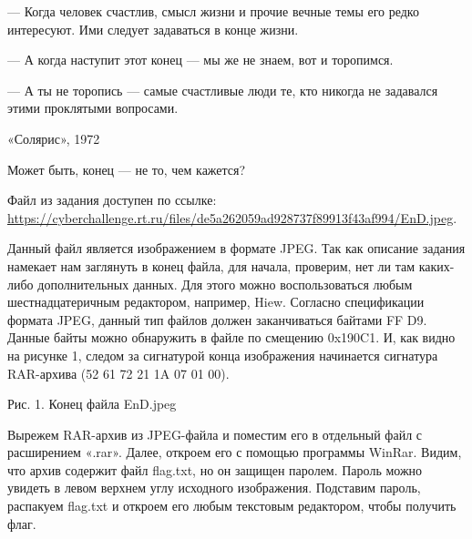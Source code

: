 
— Когда человек счастлив, смысл жизни и прочие вечные темы его редко интересуют. Ими следует задаваться в конце жизни.

— А когда наступит этот конец — мы же не знаем, вот и торопимся.

— А ты не торопись — самые счастливые люди те, кто никогда не задавался этими проклятыми вопросами.

«Солярис», 1972

Может быть, конец — не то, чем кажется?

Файл из задания доступен по ссылке: \url{https://cyberchallenge.rt.ru/files/de5a262059ad928737f89913f43af994/EnD.jpeg}.

Данный файл является изображением в формате JPEG. Так как описание задания намекает нам заглянуть в конец файла, для начала, проверим, нет ли там каких-либо дополнительных данных. Для этого можно воспользоваться любым шестнадцатеричным редактором, например, Hiew. Согласно спецификации формата JPEG, данный тип файлов должен заканчиваться байтами FF D9. Данные байты можно обнаружить в файле по смещению 0x190C1. И, как видно на рисунке 1, следом за сигнатурой конца изображения начинается сигнатура RAR-архива (52 61 72 21 1A 07 01 00).


\begin{center}
    Рис. 1. Конец файла EnD.jpeg
\end{center}

Вырежем RAR-архив из JPEG-файла и поместим его в отдельный файл с расширением «.rar». Далее, откроем его с помощью программы WinRar. Видим, что архив содержит файл flag.txt, но он защищен паролем. Пароль можно увидеть в левом верхнем углу исходного изображения. Подставим пароль, распакуем flag.txt и откроем его любым текстовым редактором, чтобы получить флаг.


